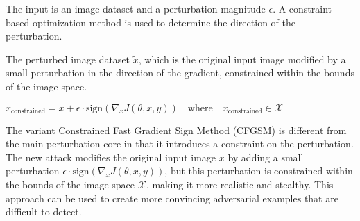 The input is an image dataset and a perturbation magnitude \(\epsilon\). A constraint-based optimization method is used to determine the direction of the perturbation.

The perturbed image dataset \(\tilde{x}\), which is the original input image modified by a small perturbation in the direction of the gradient, constrained within the bounds of the image space.

${x}_{\text{constrained}} = x + \epsilon \cdot \text{sign}(\nabla_x J(\theta, x, y)) \quad\text{where}\quad {x}_\text{constrained} \in \mathcal{X}$

The variant Constrained Fast Gradient Sign Method (CFGSM) is different from the main perturbation core in that it introduces a constraint on the perturbation. The new attack modifies the original input image $x$ by adding a small perturbation $\epsilon \cdot \text{sign}(\nabla_x J(\theta, x, y))$, but this perturbation is constrained within the bounds of the image space $\mathcal{X}$, making it more realistic and stealthy. This approach can be used to create more convincing adversarial examples that are difficult to detect.